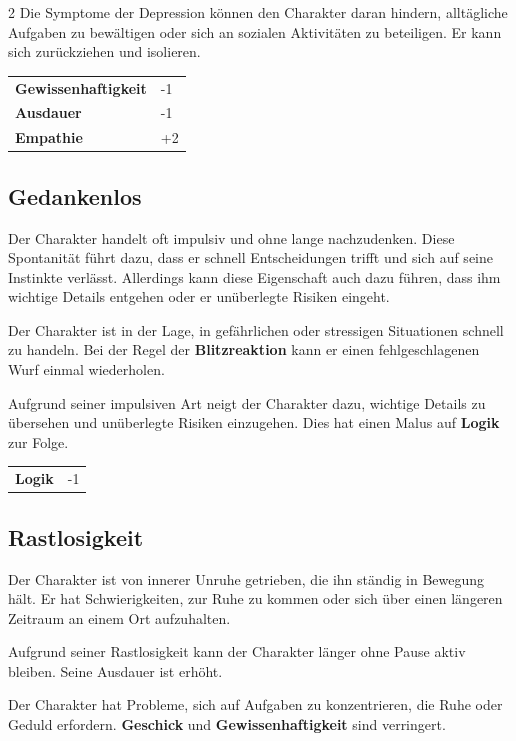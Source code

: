 \begin{multicols}{2}
    Die Symptome der Depression können den Charakter daran hindern, alltägliche Aufgaben zu bewältigen oder sich an sozialen Aktivitäten zu beteiligen. Er kann sich zurückziehen und isolieren.

    \begin{tabular}{@{}ll@{}}
        \textbf{Gewissenhaftigkeit} & -1\\
        \textbf{Ausdauer} & -1\\
        \textbf{Empathie} & +2\\
    \end{tabular}

    \subsection*{Gedankenlos}

    Der Charakter handelt oft impulsiv und ohne lange nachzudenken. Diese Spontanität führt dazu, dass er schnell Entscheidungen trifft und sich auf seine Instinkte verlässt. Allerdings kann diese Eigenschaft auch dazu führen, dass ihm wichtige Details entgehen oder er unüberlegte Risiken eingeht.

    Der Charakter ist in der Lage, in gefährlichen oder stressigen Situationen schnell zu handeln. Bei der Regel der \textbf{Blitzreaktion} kann er einen fehlgeschlagenen Wurf einmal wiederholen.

    Aufgrund seiner impulsiven Art neigt der Charakter dazu, wichtige Details zu übersehen und unüberlegte Risiken einzugehen. Dies hat einen Malus auf \textbf{Logik} zur Folge.

    \begin{tabular}{@{}ll@{}}
        \textbf{Logik} & -1\\
    \end{tabular}

    \subsection*{Rastlosigkeit}

    Der Charakter ist von innerer Unruhe getrieben, die ihn ständig in Bewegung hält. Er hat Schwierigkeiten, zur Ruhe zu kommen oder sich über einen längeren Zeitraum an einem Ort aufzuhalten.

    Aufgrund seiner Rastlosigkeit kann der Charakter länger ohne Pause aktiv bleiben. Seine Ausdauer ist erhöht.

    Der Charakter hat Probleme, sich auf Aufgaben zu konzentrieren, die Ruhe oder Geduld erfordern. \textbf{Geschick} und \textbf{Gewissenhaftigkeit} sind verringert.


\end{multicols}
